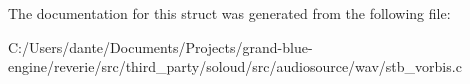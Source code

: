 The documentation for this struct was generated from the following file\+:\begin{DoxyCompactItemize}
\item 
C\+:/\+Users/dante/\+Documents/\+Projects/grand-\/blue-\/engine/reverie/src/third\+\_\+party/soloud/src/audiosource/wav/stb\+\_\+vorbis.\+c\end{DoxyCompactItemize}
